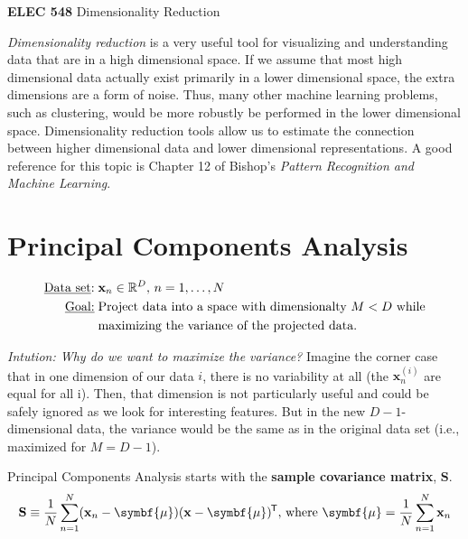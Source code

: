 \documentclass[11pt]{article}
\newcommand{\xb}{\mathbf{x}}
\newcommand{\ub}{\symbf{\mu}}
\newcommand*{\tran}{^{\mkern-1.5mu\mathsf{T}}}
\begin{document}
\setmainfont{Myriad Pro} %

\begin{center}
\large
\textbf{ELEC 548} Dimensionality Reduction
\end{center}

\textit{Dimensionality reduction} is a very useful tool for visualizing and
understanding data that are in a high dimensional space. If we assume that most
high dimensional data actually exist primarily in a lower dimensional space,
the extra dimensions are a form of noise. Thus, many other machine learning
problems, such as clustering, would be more robustly be performed in the lower
dimensional space. Dimensionality reduction tools allow us to estimate the
connection between higher dimensional data and lower dimensional
representations. A good reference for this topic is Chapter 12 of Bishop's
\textit{Pattern Recognition and Machine Learning}.

\section{Principal Components Analysis}
\begin{align*}
  \text{\underline{Data set}:} & \; \xb_n \in \mathbb{R}^D, \, n = 1, \ldots, N \\
  \text{\underline{Goal:}} & \; \text{Project data into a space with
  dimensionalty $M < D$ while} \\
  & \; \text{maximizing the variance of the projected data.}
\end{align*}

\textit{Intution: Why do we want to maximize the variance?} Imagine the corner case that in one
dimension of our data $i$, there is no variability at all (the $\xb_n^{(i)}$ are
equal for all i). Then, that dimension is not particularly useful and could be
safely ignored as we look for interesting features. But in the new
$D-1$-dimensional data, the variance would be the same as in the original data
set (i.e., maximized for $M=D-1$).

Principal Components Analysis starts with the \textbf{sample covariance matrix},
$\mathbf{S}$.
\begin{equation*}
  \mathbf{S} \equiv \frac{1}{N} \sum_{n=1}^N (\xb_n - \ub) (\xb - \ub)\tran,\,
  \text{where } \ub = \frac{1}{N} \sum_{n=1}^N \xb_n
\end{equation*}
\end{document}
